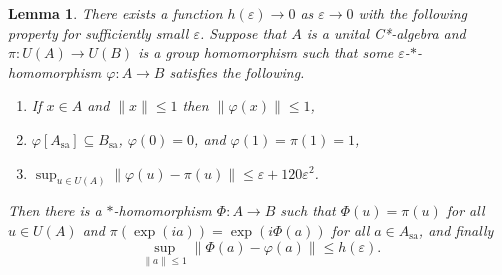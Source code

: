 \documentclass[11pt]{amsproc}
\newcommand{\cstar}{C*}
\theoremstyle{definition}
\theoremstyle{plain}
\newtheorem{lemma}[definition]{Lemma}
\theoremstyle{remark}
\begin{document}
\begin{lemma} \label{L.pi-to-rho-and-Phi.nonabelian} 
	There exists a function $h(\varepsilon)\to 0$ as $\varepsilon\to 0$ with the following property for sufficiently small $\varepsilon$. 
	Suppose that $A$ is a unital \cstar-algebra and $\pi\colon U(A)\to U(B)$ is a group homomorphism such that some $\varepsilon$-$*$-homomorphism $\varphi\colon A\to B$ satisfies the following.  
	\begin{enumerate}
		\item If $x\in A$ and $\|x\|\leq 1$ then $\|\varphi(x)\|\leq 1$,
		\item $\varphi[A_{\textrm{sa}}]\subseteq B_{\textrm{sa}}$,   $\varphi(0)=0$, and $\varphi(1)=\pi(1)=1$, 
		\item $\sup_{u\in U(A)} \|\varphi(u)-\pi(u)\|\leq \varepsilon+120\varepsilon^2$.   
	\end{enumerate} 
	Then there is  a $*$-homomorphism $\Phi\colon A\to B$ such that $\Phi(u)=\pi(u)$ for all $u\in U(A)$ and $\pi(\exp(ia))=\exp(i\Phi(a))$ for all $a\in A_{\textrm{sa}}$, and finally 
	\[
	\sup_{\|a\|\leq 1} \|\Phi(a)-\varphi(a)\|\leq h(\varepsilon). 
	\]
\end{lemma}
\end{document}
